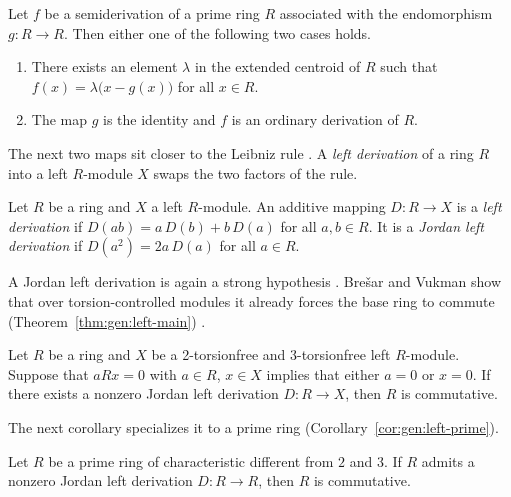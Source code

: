 \begin{theorem}\label{thm:gen:semi-structure}
Let $f$ be a semiderivation of a prime ring $R$ associated with the
endomorphism $g\colon R\to R$. Then either one of the following two cases
holds.
\begin{enumerate}[label=(\arabic*)]
\item There exists an element $\lambda$ in the extended centroid of $R$ such
that $f(x)=\lambda\bigl(x-g(x)\bigr)$ for all $x\in R$.
\item The map $g$ is the identity and $f$ is an ordinary derivation of $R$.
\end{enumerate}
\end{theorem}

The next two maps sit closer to the Leibniz rule
\cite[p.~7]{BresarVukman1990Left}. A \emph{left derivation} of a ring $R$ into
a left $R$-module $X$ swaps the two factors of the rule.

\begin{definition}\label{def:gen:left-derivation}
Let $R$ be a ring and $X$ a left $R$-module. An additive mapping
$D\colon R\to X$ is a \emph{left derivation} if
$D(ab)=a\,D(b)+b\,D(a)$ for all $a,b\in R$. It is a \emph{Jordan left
derivation} if $D(a^{2})=2a\,D(a)$ for all $a\in R$.
\end{definition}

A Jordan left derivation is again a strong hypothesis
\cite[p.~8]{BresarVukman1990Left}. Bre\v{s}ar and Vukman show that over
torsion-controlled modules it already forces the base ring to commute (Theorem~\ref{thm:gen:left-main})
\cite[p.~8]{BresarVukman1990Left}.\begin{theorem}\label{thm:gen:left-main}
Let $R$ be a ring and $X$ be a 2-torsionfree and 3-torsionfree left
$R$-module. Suppose that $aRx=0$ with $a\in R$, $x\in X$ implies that either
$a=0$ or $x=0$. If there exists a nonzero Jordan left derivation $D\colon
R\to X$, then $R$ is commutative.
\end{theorem}

The next corollary specializes it to a prime ring (Corollary~\ref{cor:gen:left-prime}).

\begin{corollary}\label{cor:gen:left-prime}
Let $R$ be a prime ring of characteristic different from $2$ and $3$. If $R$
admits a nonzero Jordan left derivation $D\colon R\to R$, then $R$ is
commutative.
\end{corollary}

